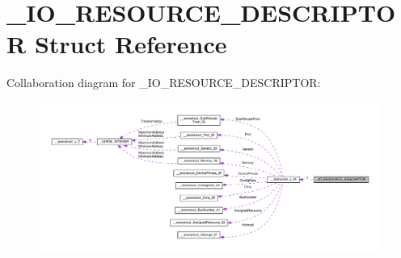 \hypertarget{struct__IO__RESOURCE__DESCRIPTOR}{}\section{\+\_\+\+I\+O\+\_\+\+R\+E\+S\+O\+U\+R\+C\+E\+\_\+\+D\+E\+S\+C\+R\+I\+P\+T\+O\+R Struct Reference}
\label{struct__IO__RESOURCE__DESCRIPTOR}


Collaboration diagram for \+\_\+\+I\+O\+\_\+\+R\+E\+S\+O\+U\+R\+C\+E\+\_\+\+D\+E\+S\+C\+R\+I\+P\+T\+O\+R\+:
\nopagebreak
\begin{figure}[H]
\begin{center}
\leavevmode
\includegraphics[width=350pt]{struct__IO__RESOURCE__DESCRIPTOR__coll__graph}
\end{center}
\end{figure}

